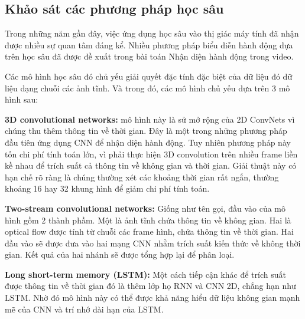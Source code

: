 








\subsection{Khảo sát các phương pháp học sâu}

Trong những năm gần đây, việc ứng dụng học sâu vào thị giác máy tính đã nhận được nhiều sự quan tâm đáng kể. Nhiều phương pháp biểu diễn hành động dựa trên học sâu đã được đề xuất trong bài toán Nhận diện hành động trong video.

Các mô hình học sâu đó chủ yếu giải quyết đặc tính đặc biệt của dữ liệu đó dữ liệu dạng chuỗi các ảnh tĩnh. Và trong đó, các mô hình chủ yếu dựa trên 3 mô hình sau:


\textbf{3D convolutional networks:} mô hình này là sử mở rộng của 2D ConvNets vì chúng thu thêm thông tin về thời gian. Đây là một trong những phương pháp đầu tiên ứng dụng CNN để nhận diện hành động. Tuy nhiên phương pháp này tốn chi phí tính toán lớn, vì phải thực hiện 3D convolution trên nhiều frame liền kề nhau để trích suất cả thông tin về không gian và thời gian. Giải thuật này có hạn chế  rõ ràng là chúng thường xét các khoảng thời gian rất ngắn, thường khoảng 16 hay 32 khung hình để giảm chi phí tính toán.

\textbf{Two-stream convolutional networks:} Giống như tên gọi, đầu vào của mô hình gồm 2 thành phầm. Một là ảnh tĩnh chứa thông tin về không gian. Hai là optical flow được tính từ chuỗi các frame hình, chứa thông tin về thời gian. Hai đầu vào sẽ được đưa vào hai mạng CNN nhằm trích suất kiến thức về không thời gian. Kết quả của hai nhánh sẽ được tổng hợp lại để phân loại.

\textbf{Long short-term memory (LSTM):} Một cách tiếp cận khác để trích suất được thông tin về thời gian đó là thêm lớp họ RNN và CNN 2D, chẳng hạn như LSTM. Nhờ đó mô hình này có thể được khả năng hiểu dữ liệu không gian mạnh mẽ của CNN và trí nhớ dài hạn của LSTM.